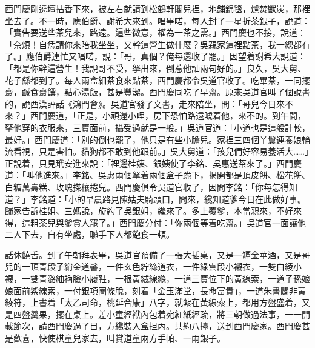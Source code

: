 西門慶剛遶壇拈香下來，被左右就請到松鶴軒閣兒裡，地鋪錦毯，爐焚獸炭，那裡坐去了。不一時，應伯爵、謝希大來到。唱畢喏，每人封了一星折茶銀子，說道：「實告要送些茶兒來，路遠。這些微意，權為一茶之需。」西門慶也不接，說道：「奈煩！自恁請你來陪我坐坐，又幹這營生做什麼？吳親家這裡點茶，我一總都有了。」應伯爵連忙又唱喏，說：「哥，真個？俺每還收了罷。」因望着謝希大說道：「都是你幹這營生！我說哥不受，拏出來，倒惹他訕兩句好的。」{}良久，吳大舅、花子繇都到了。每人兩盒細茶食來點茶，西門慶都令吳道官收了。吃畢茶，一同擺齋，鹹食齋饌，點心湯飯，甚是豐潔。西門慶同吃了早齋。原來吳道官叫了個說書的，說西漢評話《鴻門會》。{}吳道官發了文書，走來陪坐，問：「哥兒今日來不來？」西門慶道，「正是，小頑還小哩，房下恐怕路遠唬着他，來不的。到午間，拏他穿的衣服來，三寶面前，攝受過就是一般。」吳道官道：「小道也是這般計較，最好。」西門慶道：「別的倒也罷了，他只是有些小膽兒。家裡三四個丫鬟連養娘輪流看視，只是害怕。貓狗都不敢到他跟前。」{}吳大舅道：「孩兒們好容易養活大……」正說着，只見玳安進來說：「裡邊桂姨、銀姨使了李銘、吳惠送茶來了。」西門慶道：「叫他進來。」李銘、吳惠兩個拏着兩個盒子跪下，揭開都是頂皮餅、松花餅、白糖萬壽糕、玫瑰搽穰捲兒。西門慶俱令吳道官收了，因問李銘：「你每怎得知道？」李銘道：「小的早晨路見陳姑夫騎頭口，問來，纔知道爹今日在此做好事。歸家告訴桂姐、三媽說，旋約了吳銀姐，纔來了。多上覆爹，本當親來，不好來得，這粗茶兒與爹賞人罷了。」西門慶分付：「你兩個等着吃齋。」吳道官一面讓他二人下去，自有坐處，聯手下人都飽食一頓。

話休饒舌。到了午朝拜表畢，吳道官預備了一張大插桌，又是一罈金華酒，又是哥兒的一頂青段子綃金道髻，一件玄色紵絲道衣，一件綠雲段小襯衣，一雙白綾小襪，一雙青潞紬衲臉小履鞋，一根黃絨線縧，一道三寶位下的黃線索，一道子孫娘娘面前紫線索，一付銀項圈條脫，刻着「金玉滿堂，長命富貴」，一道朱書闢非黃綾符，上書着「太乙司命，桃延合康」八字，就紮在黃線索上，都用方盤盛着，又是四盤羹果，擺在桌上。差小童經袱內包着宛紅紙經疏，將三朝做過法事，一一開載節次，請西門慶過了目，方纔裝入盒担內。共約八擡，送到西門慶家。西門慶甚是歡喜，快使棋童兒家去，叫賞道童兩方手帕、一兩銀子。

